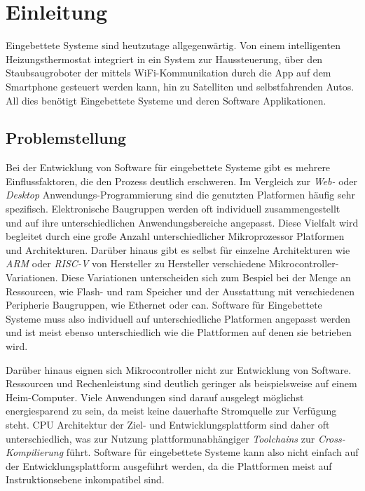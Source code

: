 
\chapter{Einleitung}

Eingebettete Systeme sind heutzutage allgegenwärtig.
Von einem intelligenten Heizungsthermostat integriert in ein System zur Haussteuerung,
über den Staubsaugroboter der mittels WiFi-Kommunikation durch die App auf dem
Smartphone gesteuert werden kann, hin zu Satelliten und selbstfahrenden Autos.
All dies benötigt Eingebettete Systeme und deren Software Applikationen.

\section{Problemstellung}

Bei der Entwicklung von Software für eingebettete Systeme gibt es mehrere Einflussfaktoren,
die den Prozess deutlich erschweren.
Im Vergleich zur \textit{Web-} oder \textit{Desktop} Anwendungs-Programmierung
sind die genutzten Platformen häufig sehr spezifisch.
Elektronische Baugruppen werden oft individuell zusammengestellt und auf ihre
unterschiedlichen Anwendungsbereiche angepasst.
Diese Vielfalt wird begleitet durch eine große Anzahl unterschiedlicher Mikroprozessor
Platformen und Architekturen.
Darüber hinaus gibt es selbst für einzelne Architekturen wie \textit{ARM}
oder \textit{RISC-V} von Hersteller zu Hersteller
verschiedene Mikrocontroller-Variationen.
Diese Variationen unterscheiden sich zum Bespiel bei der Menge an Ressourcen, wie
Flash- und \ac{ram} Speicher und der Ausstattung mit verschiedenen Peripherie Baugruppen,
wie Ethernet oder \ac{can}.
Software für Eingebettete Systeme muss also individuell auf unterschiedliche Platformen
angepasst werden und ist meist ebenso unterschiedlich wie die Plattformen auf denen
sie betrieben wird.

Darüber hinaus eignen sich Mikrocontroller nicht zur Entwicklung von Software.
Ressourcen und Rechenleistung sind deutlich geringer als beispielsweise auf einem
Heim-Computer.
Viele Anwendungen sind darauf ausgelegt möglichst energiesparend zu sein, da meist
keine dauerhafte Stromquelle zur Verfügung steht.
CPU Architektur der Ziel- und Entwicklungsplattform sind daher oft unterschiedlich,
was zur Nutzung plattformunabhängiger \textit{Toolchains} zur \textit{Cross-Kompilierung}
führt.
Software für eingebettete Systeme kann also nicht einfach auf der
Entwicklungsplattform ausgeführt werden, da die Plattformen meist auf
Instruktionsebene inkompatibel sind.

